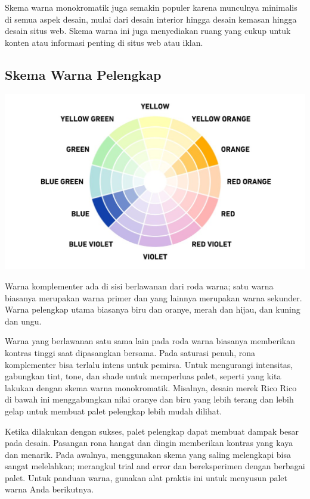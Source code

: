 \documentclass[a4paper]{article}
\begin{document}
Skema warna monokromatik juga semakin populer karena munculnya minimalis di semua aspek desain, mulai dari desain interior hingga desain kemasan hingga desain situs web. Skema warna ini juga menyediakan ruang yang cukup untuk konten atau informasi penting di situs web atau iklan.

\subsection{Skema Warna Pelengkap}
\begin{center}
  \includegraphics[width=\textwidth]{resources/pelengkap.jpg}
\end{center}
Warna komplementer ada di sisi berlawanan dari roda warna; satu warna biasanya merupakan warna primer dan yang lainnya merupakan warna sekunder. Warna pelengkap utama biasanya biru dan oranye, merah dan hijau, dan kuning dan ungu.

Warna yang berlawanan satu sama lain pada roda warna biasanya memberikan kontras tinggi saat dipasangkan bersama. Pada saturasi penuh, rona komplementer bisa terlalu intens untuk pemirsa. Untuk mengurangi intensitas, gabungkan tint, tone, dan shade untuk memperluas palet, seperti yang kita lakukan dengan skema warna monokromatik. Misalnya, desain merek Rico Rico di bawah ini menggabungkan nilai oranye dan biru yang lebih terang dan lebih gelap untuk membuat palet pelengkap lebih mudah dilihat.

Ketika dilakukan dengan sukses, palet pelengkap dapat membuat dampak besar pada desain. Pasangan rona hangat dan dingin memberikan kontras yang kaya dan menarik. Pada awalnya, menggunakan skema yang saling melengkapi bisa sangat melelahkan; merangkul trial and error dan bereksperimen dengan berbagai palet. Untuk panduan warna, gunakan alat praktis ini untuk menyusun palet warna Anda berikutnya.
\end{document}
